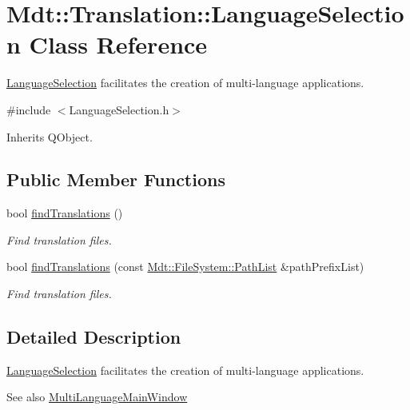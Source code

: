 \hypertarget{class_mdt_1_1_translation_1_1_language_selection}{}\section{Mdt\+:\+:Translation\+:\+:Language\+Selection Class Reference}
\label{class_mdt_1_1_translation_1_1_language_selection}


\hyperlink{class_mdt_1_1_translation_1_1_language_selection}{Language\+Selection} facilitates the creation of multi-\/language applications.  




{\ttfamily \#include $<$Language\+Selection.\+h$>$}



Inherits Q\+Object.

\subsection*{Public Member Functions}
\begin{DoxyCompactItemize}
\item 
bool \hyperlink{class_mdt_1_1_translation_1_1_language_selection_ac6476448a4858855ebdf61f362e7d7d4}{find\+Translations} ()
\begin{DoxyCompactList}\small\item\em Find translation files. \end{DoxyCompactList}\item 
bool \hyperlink{class_mdt_1_1_translation_1_1_language_selection_a84dec6386bcba1f18fb8fef20d13e1cf}{find\+Translations} (const \hyperlink{class_mdt_1_1_file_system_1_1_path_list}{Mdt\+::\+File\+System\+::\+Path\+List} \&path\+Prefix\+List)
\begin{DoxyCompactList}\small\item\em Find translation files. \end{DoxyCompactList}\end{DoxyCompactItemize}


\subsection{Detailed Description}
\hyperlink{class_mdt_1_1_translation_1_1_language_selection}{Language\+Selection} facilitates the creation of multi-\/language applications. 

\begin{DoxySeeAlso}{See also}
\hyperlink{class_multi_language_main_window}{Multi\+Language\+Main\+Window} 
\end{DoxySeeAlso}


